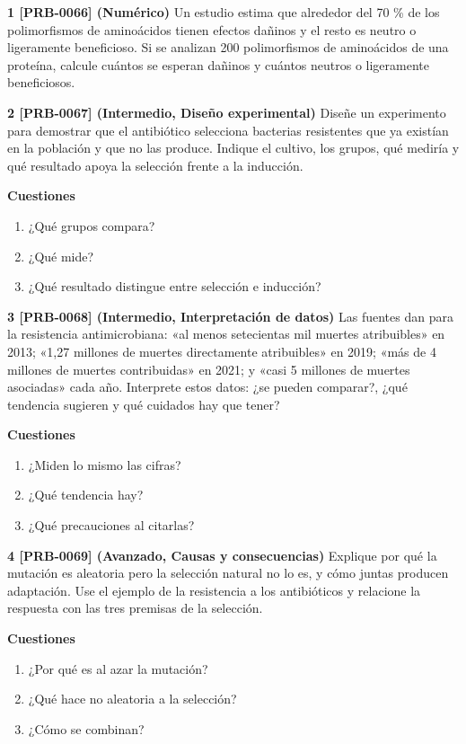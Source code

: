 \documentclass{book}
\begin{document}
\begin{tcolorbox}[title={Ejercicios}, studiumworked, breakable]

\noindent\textbf{1 [PRB-0066] (Numérico)}
Un estudio estima que alrededor del 70 \% de los polimorfismos de aminoácidos tienen efectos dañinos y el resto es neutro o ligeramente beneficioso. Si se analizan 200 polimorfismos de aminoácidos de una proteína, calcule cuántos se esperan dañinos y cuántos neutros o ligeramente beneficiosos.


\noindent\textbf{2 [PRB-0067] (Intermedio, Diseño experimental)}
Diseñe un experimento para demostrar que el antibiótico selecciona bacterias resistentes que ya existían en la población y que no las produce. Indique el cultivo, los grupos, qué mediría y qué resultado apoya la selección frente a la inducción.


\noindent\textbf{Cuestiones}
\begin{enumerate}
\item ¿Qué grupos compara?
\item ¿Qué mide?
\item ¿Qué resultado distingue entre selección e inducción?
\end{enumerate}

\noindent\textbf{3 [PRB-0068] (Intermedio, Interpretación de datos)}
Las fuentes dan para la resistencia antimicrobiana: «al menos setecientas mil muertes atribuibles» en 2013; «1,27 millones de muertes directamente atribuibles» en 2019; «más de 4 millones de muertes contribuidas» en 2021; y «casi 5 millones de muertes asociadas» cada año. Interprete estos datos: ¿se pueden comparar?, ¿qué tendencia sugieren y qué cuidados hay que tener?


\noindent\textbf{Cuestiones}
\begin{enumerate}
\item ¿Miden lo mismo las cifras?
\item ¿Qué tendencia hay?
\item ¿Qué precauciones al citarlas?
\end{enumerate}

\noindent\textbf{4 [PRB-0069] (Avanzado, Causas y consecuencias)}
Explique por qué la mutación es aleatoria pero la selección natural no lo es, y cómo juntas producen adaptación. Use el ejemplo de la resistencia a los antibióticos y relacione la respuesta con las tres premisas de la selección.


\noindent\textbf{Cuestiones}
\begin{enumerate}
\item ¿Por qué es al azar la mutación?
\item ¿Qué hace no aleatoria a la selección?
\item ¿Cómo se combinan?
\end{enumerate}


\end{tcolorbox}
\end{document}
